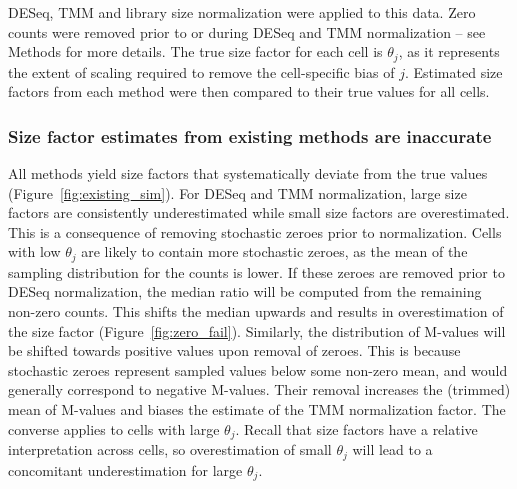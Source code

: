 \documentclass{bmcart}
\begin{document}
DESeq, TMM and library size normalization were applied to this data.
Zero counts were removed prior to or during DESeq and TMM normalization -- see Methods for more details.
The true size factor for each cell is $\theta_j$, as it represents the extent of scaling required to remove the cell-specific bias of $j$.
Estimated size factors from each method were then compared to their true values for all cells.

\subsubsection*{Size factor estimates from existing methods are inaccurate}
All methods yield size factors that systematically deviate from the true values (Figure~\ref{fig:existing_sim}).
For DESeq and TMM normalization, large size factors are consistently underestimated while small size factors are overestimated.
This is a consequence of removing stochastic zeroes prior to normalization.
Cells with low $\theta_j$ are likely to contain more stochastic zeroes, as the mean of the sampling distribution for the counts is lower.
If these zeroes are removed prior to DESeq normalization, the median ratio will be computed from the remaining non-zero counts.
This shifts the median upwards and results in overestimation of the size factor (Figure~\ref{fig:zero_fail}).
Similarly, the distribution of M-values will be shifted towards positive values upon removal of zeroes.
This is because stochastic zeroes represent sampled values below some non-zero mean, and would generally correspond to negative M-values.
Their removal increases the (trimmed) mean of M-values and biases the estimate of the TMM normalization factor.
The converse applies to cells with large $\theta_j$.
Recall that size factors have a relative interpretation across cells, so overestimation of small $\theta_j$ will lead to a concomitant underestimation for large $\theta_j$.
\end{document}
